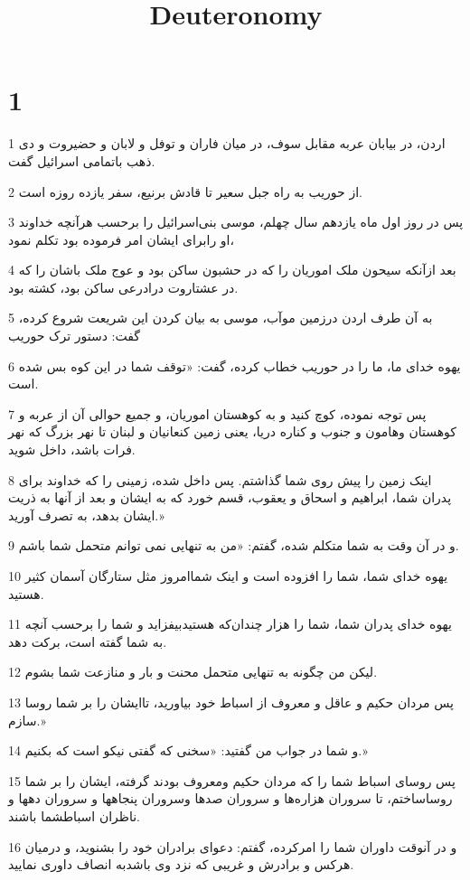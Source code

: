 

\title{Deuteronomy}

 
\chapter{1}

\par 1 اردن، در بیابان عربه مقابل سوف، در میان فاران و توفل و لابان و حضیروت و دی ذهب باتمامی اسرائیل گفت.
\par 2 از حوریب به راه جبل سعیر تا قادش برنیع، سفر یازده روزه است.
\par 3 پس در روز اول ماه یازدهم سال چهلم، موسی بنی‌اسرائیل را برحسب هرآنچه خداوند او رابرای ایشان امر فرموده بود تکلم نمود،
\par 4 بعد ازآنکه سیحون ملک اموریان را که در حشبون ساکن بود و عوج ملک باشان را که در عشتاروت درادرعی ساکن بود، کشته بود.
\par 5 به آن طرف اردن درزمین موآب، موسی به بیان کردن این شریعت شروع کرده، گفت: دستور ترک حوریب
\par 6 یهوه خدای ما، ما را در حوریب خطاب کرده، گفت: «توقف شما در این کوه بس شده است.
\par 7 پس توجه نموده، کوچ کنید و به کوهستان اموریان، و جمیع حوالی آن از عربه و کوهستان وهامون و جنوب و کناره دریا، یعنی زمین کنعانیان و لبنان تا نهر بزرگ که نهر فرات باشد، داخل شوید.
\par 8 اینک زمین را پیش روی شما گذاشتم. پس داخل شده، زمینی را که خداوند برای پدران شما، ابراهیم و اسحاق و یعقوب، قسم خورد که به ایشان و بعد از آنها به ذریت ایشان بدهد، به تصرف آورید.»
\par 9 و در آن وقت به شما متکلم شده، گفتم: «من به تنهایی نمی توانم متحمل شما باشم.
\par 10 یهوه خدای شما، شما را افزوده است و اینک شماامروز مثل ستارگان آسمان کثیر هستید.
\par 11 یهوه خدای پدران شما، شما را هزار چندان‌که هستیدبیفزاید و شما را برحسب آنچه به شما گفته است، برکت دهد.
\par 12 لیکن من چگونه به تنهایی متحمل محنت و بار و منازعت شما بشوم.
\par 13 پس مردان حکیم و عاقل و معروف از اسباط خود بیاورید، تاایشان را بر شما روسا سازم.»
\par 14 و شما در جواب من گفتید: «سخنی که گفتی نیکو است که بکنیم.»
\par 15 پس روسای اسباط شما را که مردان حکیم ومعروف بودند گرفته، ایشان را بر شما روساساختم، تا سروران هزاره‌ها و سروران صدها وسروران پنجاهها و سروران دهها و ناظران اسباطشما باشند.
\par 16 و در آنوقت داوران شما را امرکرده، گفتم: دعوای برادران خود را بشنوید، و درمیان هرکس و برادرش و غریبی که نزد وی باشدبه انصاف داوری نمایید.

